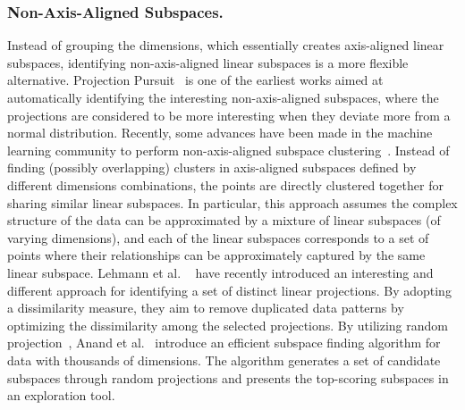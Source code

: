 \subsubsection{Non-Axis-Aligned Subspaces.}
Instead of grouping the dimensions, which essentially creates axis-aligned linear subspaces, identifying non-axis-aligned linear subspaces is a more flexible alternative.
%
Projection Pursuit~\cite{FriedmanTukey1974} is one of the earliest works aimed at automatically identifying the interesting non-axis-aligned subspaces, where the projections are considered to be more interesting when they deviate more from a normal distribution.
%
Recently, some advances have been made in the machine learning community to perform non-axis-aligned subspace clustering~\cite{Vidal2011}.
%
Instead of finding (possibly overlapping) clusters in axis-aligned subspaces defined by different dimensions combinations, the points are directly clustered together for sharing similar linear subspaces.
%
In particular, this approach assumes the complex structure of the data can be approximated by a mixture of linear subspaces (of varying dimensions), and each of the linear subspaces corresponds to a set of points where their relationships can be approximately captured by the same linear subspace.
%
Lehmann et al. ~\cite{LehmannTheisel2016} have recently introduced an interesting and different approach for identifying a set of distinct linear projections.
%
By adopting a dissimilarity measure, they aim to remove duplicated data patterns by optimizing the dissimilarity among the selected projections.
%
By utilizing random projection~\cite{BinghamMannila2001}, Anand et al.~\cite{AnandWilkinsonDang2012} introduce an efficient subspace finding algorithm for data with thousands of dimensions.
%
The algorithm generates a set of candidate subspaces through random projections and presents the top-scoring subspaces in an exploration tool.